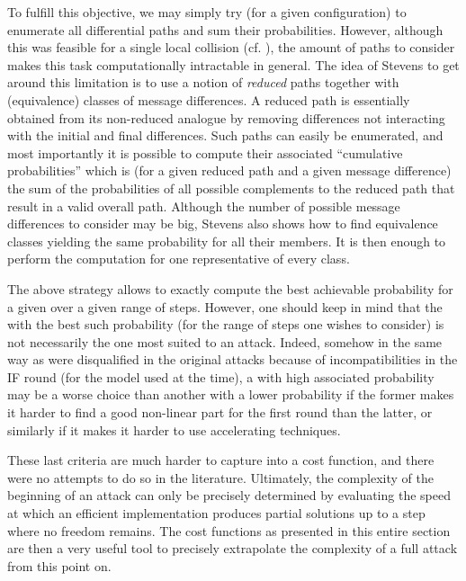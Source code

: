 To fulfill this objective, we may simply try (for a given configuration) to enumerate all differential paths and sum their probabilities. However, although this was feasible for a single local collision
(cf. \cite{DBLP:conf/fse/MendelPRR06a}),
the amount of paths to consider makes this task computationally intractable in general. The idea of Stevens to get around this limitation is to use a notion of \emph{reduced} paths together with
(equivalence) classes of message differences. A reduced path is essentially obtained from its non-reduced analogue by removing differences not interacting with the initial and final differences. Such
paths can easily be enumerated, and most importantly it is possible to compute their associated ``cumulative probabilities'' which is (for a given reduced path and a given message difference) the sum of
the probabilities of all possible complements to the reduced path that result in a valid overall path. Although the number of possible message differences to consider may be big, Stevens also shows how
to find equivalence classes yielding the same probability for all their members. It is then enough to perform the computation for one representative of every class.


\medskip

The above strategy allows to exactly compute the best achievable probability for a given \dv over a given range of steps. However, one should keep in mind that the \dv with the best such
probability (for the range of steps one wishes to consider) is not necessarily the one most suited to an attack. Indeed, somehow in the same way as \dvs were disqualified in the original \shazero
attacks because of incompatibilities in the IF round (for the model used at the time), a \dv with high associated probability may be a worse choice than another with a lower probability if the former
makes it harder to find a good non-linear part for the first round than the latter, or similarly if it makes it harder to use accelerating techniques.

These last criteria are much harder to capture into a cost function, and there were no attempts to do so in the literature. Ultimately, the complexity of the beginning of an attack can only
be precisely determined by evaluating the speed at which an efficient implementation produces partial solutions up to a step where no freedom remains.
The cost functions as presented in this entire section are then a very useful tool to precisely extrapolate the complexity of a full attack from this point on.

